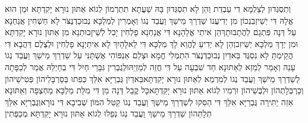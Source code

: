 \documentclass[../main/main.tex]{subfiles}
\begin{document}
\begin{multicols*}{\ncols}
וְתִסְגְּדוּן לְצַלְמָא דִי עַבְדֵת וְהֵן לָא תִסְגְּדוּן בַּהּ שַׁעֲתָא תִתְרְמוֹן לְגוֹא אַתּוּן נוּרָא יָקִדְתָּא וּמַן הוּא אֱלָהּ דִּי יְשֵׁיזְבִנְכוֹן מִן יְדִי\SubEnd{}\PreVerseSpace{}עֲנוֹ שַׁדְרַךְ מֵישַׁךְ וַעֲבֵד נְגוֹ וְאָמְרִין לְמַלְכָּא נְבוּכַדְנֶצֹּר לָא חַשְׁחִין אֲנַחְנָא עַל דְּנָה פִּתְגָם לַהֲתָבוּתָךְ\PreVerseSpace{}הֵן אִיתַי אֱלָהָנָא דִּי אֲנַחְנָא פָלְחִין יָכִל לְשֵׁיזָבוּתַנָא מִן אַתּוּן נוּרָא יָקִדְתָּא וּמִן יְדָךְ מַלְכָּא יְשֵׁיזִב\PreVerseSpace{}וְהֵן לָא יְדִיעַ לֶהֱוֵא לָךְ מַלְכָּא דִּי לֵאלָהָיִךְ לָא אִיתַיְנָא פָלְחִין וּלְצֶלֶם דַּהֲבָא דִּי הֲקֵימְתָּ לָא נִסְגֻּד \ClosedSection{}בֵּאדַיִן נְבוּכַדְנֶצֹּר הִתְמְלִי חֱמָא וּצְלֵם אַנְפּוֹהִי אֶשְׁתַּנִּי\SubEnd{} עַל שַׁדְרַךְ מֵישַׁךְ וַעֲבֵד נְגוֹ עָנֵה וְאָמַר לְמֵזֵא לְאַתּוּנָא חַד שִׁבְעָה עַל דִּי חֲזֵה לְמֵזְיֵהּ\PreVerseSpace{}וּלְגֻבְרִין גִּבָּרֵי חַיִל דִּי בְחַיְלֵהּ אֲמַר לְכַפָּתָה לְשַׁדְרַךְ מֵישַׁךְ וַעֲבֵד נְגוֹ לְמִרְמֵא לְאַתּוּן נוּרָא יָקִדְתָּא\PreVerseSpace{}בֵּאדַיִן גֻּבְרַיָּא אִלֵּךְ כְּפִתוּ בְּסַרְבָּלֵיהוֹן פְּטִישֵׁיהוֹן וְכַרְבְּלָתְהוֹן וּלְבֻשֵׁיהוֹן וּרְמִיו לְגוֹא אַתּוּן נוּרָא יָקִדְתָּא\PreVerseSpace{}כָּל קֳבֵל דְּנָה מִן דִּי מִלַּת מַלְכָּא מַחְצְפָה וְאַתּוּנָא אֵזֵה יַתִּירָה גֻּבְרַיָּא אִלֵּךְ דִּי הַסִּקוּ לְשַׁדְרַךְ מֵישַׁךְ וַעֲבֵד נְגוֹ קַטִּל הִמּוֹן שְׁבִיבָא דִּי נוּרָא\PreVerseSpace{}וְגֻבְרַיָּא אִלֵּךְ תְּלָתֵּהוֹן שַׁדְרַךְ מֵישַׁךְ וַעֲבֵד נְגוֹ נְפַלוּ לְגוֹא אַתּוּן נוּרָא יָקִדְתָּא מְכַפְּתִין\OpenSection{}\par

\end{multicols*}
\end{document}

